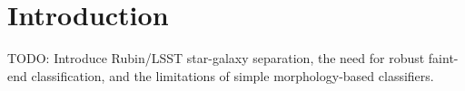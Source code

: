\section{Introduction}

TODO: Introduce Rubin/LSST star-galaxy separation, the need for robust faint-end classification, and the limitations of simple morphology-based classifiers.
